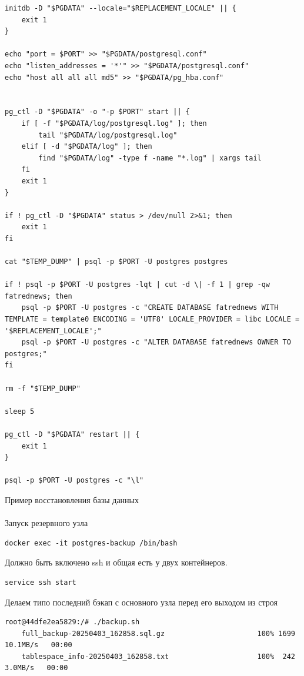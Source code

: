 \documentclass{article}
\begin{document}
\begin{lstlisting}[caption={kitty}, label={lst:example}]
initdb -D "$PGDATA" --locale="$REPLACEMENT_LOCALE" || {
    exit 1
}

echo "port = $PORT" >> "$PGDATA/postgresql.conf"
echo "listen_addresses = '*'" >> "$PGDATA/postgresql.conf"
echo "host all all all md5" >> "$PGDATA/pg_hba.conf"


pg_ctl -D "$PGDATA" -o "-p $PORT" start || {
    if [ -f "$PGDATA/log/postgresql.log" ]; then
        tail "$PGDATA/log/postgresql.log"
    elif [ -d "$PGDATA/log" ]; then
        find "$PGDATA/log" -type f -name "*.log" | xargs tail
    fi
    exit 1
}

if ! pg_ctl -D "$PGDATA" status > /dev/null 2>&1; then
    exit 1
fi

cat "$TEMP_DUMP" | psql -p $PORT -U postgres postgres

if ! psql -p $PORT -U postgres -lqt | cut -d \| -f 1 | grep -qw fatrednews; then
    psql -p $PORT -U postgres -c "CREATE DATABASE fatrednews WITH TEMPLATE = template0 ENCODING = 'UTF8' LOCALE_PROVIDER = libc LOCALE = '$REPLACEMENT_LOCALE';"
    psql -p $PORT -U postgres -c "ALTER DATABASE fatrednews OWNER TO postgres;"
fi

rm -f "$TEMP_DUMP"

sleep 5

pg_ctl -D "$PGDATA" restart || {
    exit 1
}

psql -p $PORT -U postgres -c "\l"
\end{lstlisting}


Пример восстановления базы данных
\\ \\
Запуск резервного узла
\begin{lstlisting}[caption={kitty}, label={lst:example}]
    docker exec -it postgres-backup /bin/bash
\end{lstlisting}

Должно быть включено ssh и общая есть у двух контейнеров.
\begin{lstlisting}[caption={kitty}, label={lst:example}]
    service ssh start
\end{lstlisting}

Делаем типо последний бэкап с основного узла перед его выходом из строя
\begin{lstlisting}[caption={kitty}, label={lst:example}]
root@44dfe2ea5829:/# ./backup.sh 
    full_backup-20250403_162858.sql.gz                      100% 1699    10.1MB/s   00:00    
    tablespace_info-20250403_162858.txt                     100%  242     3.0MB/s   00:00 
\end{lstlisting}
\end{document}
